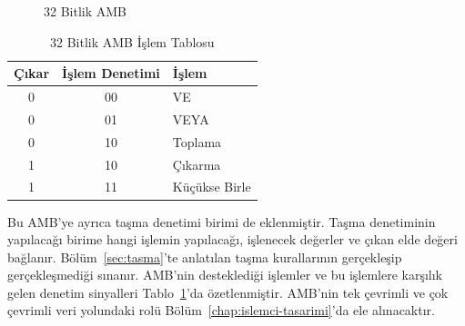 \begin{figure}[htbp]
\caption{32 Bitlik AMB}
\label{fig:32bit-amb}
\end{figure}

\begin{table}[htbp]
\centering
\caption{32 Bitlik AMB İşlem Tablosu}
\label{tab:amb-islem}
\begin{tabular}{c c l}
\toprule
\textbf{Çıkar} & \textbf{İşlem Denetimi} & \textbf{İşlem} \\
\midrule
0 & 00 & VE \\
0 & 01 & VEYA \\
0 & 10 & Toplama \\
1 & 10 & Çıkarma \\
1 & 11 & Küçükse Birle \\
\bottomrule
\end{tabular}
\end{table}

Bu AMB'ye ayrıca taşma denetimi birimi de eklenmiştir. Taşma denetiminin yapılacağı birime hangi işlemin yapılacağı, işlenecek değerler ve çıkan elde değeri bağlanır. Bölüm~\ref{sec:tasma}'te anlatılan taşma kurallarının gerçekleşip gerçekleşmediği sınanır. AMB'nin desteklediği işlemler ve bu işlemlere karşılık gelen denetim sinyalleri Tablo~\ref{tab:amb-islem}'da özetlenmiştir. AMB'nin tek çevrimli ve çok çevrimli veri yolundaki rolü Bölüm~\ref{chap:islemci-tasarimi}'da ele alınacaktır.

